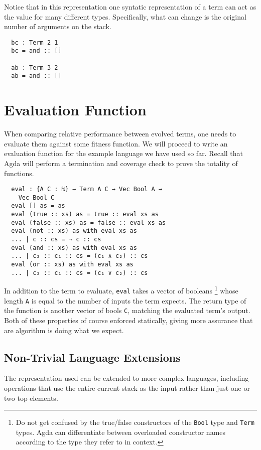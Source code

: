 \documentclass{acm_proc_article-sp}
\begin{document}
Notice that in this representation one syntatic representation of a
term can act as the value for many different types. Specifically, what
can change is the original number of arguments on the stack.

\begin{verbatim}
  bc : Term 2 1
  bc = and :: []

  ab : Term 3 2
  ab = and :: []
\end{verbatim}

\section{Evaluation Function}

When comparing relative performance between evolved terms, one needs
to evaluate them against some fitness function. We will proceed to write
an evaluation function for the example language we have used so
far. Recall that Agda will perform a termination and coverage check to
prove the totality of functions.

\begin{verbatim}
  eval : {A C : ℕ} → Term A C → Vec Bool A →
    Vec Bool C
  eval [] as = as
  eval (true :: xs) as = true :: eval xs as
  eval (false :: xs) as = false :: eval xs as
  eval (not :: xs) as with eval xs as
  ... | c :: cs = ¬ c :: cs
  eval (and :: xs) as with eval xs as
  ... | c₂ :: c₁ :: cs = (c₁ ∧ c₂) :: cs
  eval (or :: xs) as with eval xs as
  ... | c₂ :: c₁ :: cs = (c₁ ∨ c₂) :: cs
\end{verbatim}

In addition to the term to evaluate, \texttt{eval} takes a vector of
booleans \footnote{Do not get confused by the true/false constructors
  of the \texttt{Bool} type and \texttt{Term} types. Agda can
  differentiate between overloaded constructor names according to the
  type they refer to in context.}
whose length \texttt{A} is equal to the number of inputs the
term expects. The return type of the function is another vector of
bools \texttt{C}, matching the evaluated term's output. Both of these
properties of course enforced statically, giving more assurance that
are algorithm is doing what we expect.

\subsection{Non-Trivial Language Extensions}

The representation used can be extended to more complex languages,
including operations that use the entire current stack as the input
rather than just one or two top elements.
\end{document}
